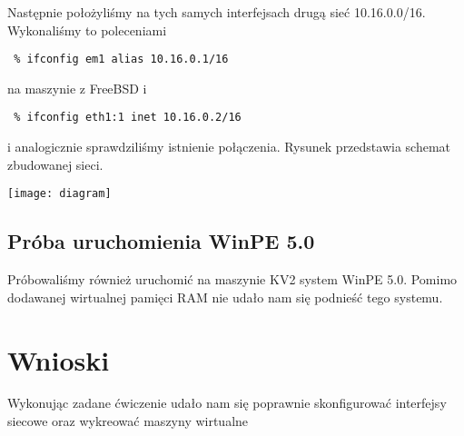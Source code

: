 \documentclass[a4paper,11pt,notitlepage]{article}
\begin{document}
Następnie położyliśmy na tych samych interfejsach drugą sieć 10.16.0.0/16. Wykonaliśmy to poleceniami
\begin{verbatim}
 % ifconfig em1 alias 10.16.0.1/16
\end{verbatim}
na maszynie z FreeBSD i 
\begin{verbatim}
 % ifconfig eth1:1 inet 10.16.0.2/16
\end{verbatim} i analogicznie sprawdziliśmy istnienie połączenia. Rysunek przedstawia schemat zbudowanej sieci.

\texttt{[image: diagram]}

\subsection{Próba uruchomienia WinPE 5.0}
Próbowaliśmy również uruchomić na maszynie KV2 system WinPE 5.0. Pomimo dodawanej wirtualnej pamięci RAM nie udało nam się podnieść tego systemu.

\section{Wnioski}
Wykonując zadane ćwiczenie udało nam się poprawnie skonfigurować interfejsy siecowe oraz wykreować maszyny wirtualne 
\end{document}
